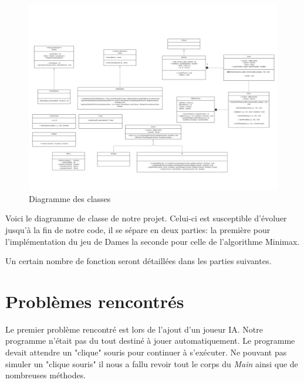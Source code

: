 \documentclass[12,french]{report}
\begin{document}
\begin{figure}[H]
	\center
	\includegraphics[width=1\textwidth]{./Images/Diagramme_classe}
	\caption{Diagramme des classes}
\end{figure}\vspace{0.2cm}



Voici le diagramme de classe de notre projet. Celui-ci est susceptible
d'évoluer jusqu'à la fin de notre code, il se sépare en deux parties:
la première pour l'implémentation du jeu de Dames la seconde pour
celle de l'algorithme Minimax.

Un certain nombre de fonction seront détaillées dans les parties suivantes.


\chapter{Problèmes rencontrés}

Le premier problème rencontré est lors de l'ajout d'un joueur IA. Notre programme n'était pas du tout destiné à jouer automatiquement. Le programme devait attendre un "clique" souris pour continuer à s'exécuter. Ne pouvant pas simuler un "clique souris" il nous a fallu revoir tout le corps du \textit{Main} ainsi que de nombreuses méthodes.\\
\end{document}
